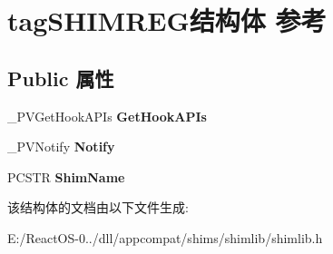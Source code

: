 \hypertarget{structtag_s_h_i_m_r_e_g}{}\section{tag\+S\+H\+I\+M\+R\+E\+G结构体 参考}
\label{structtag_s_h_i_m_r_e_g}
\subsection*{Public 属性}
\begin{DoxyCompactItemize}
\item 
\mbox{\label{structtag_s_h_i_m_r_e_g_aa53c592e6fc3a531d4a0d12100a64b00}} 
\+\_\+\+P\+V\+Get\+Hook\+A\+P\+Is {\bfseries Get\+Hook\+A\+P\+Is}
\item 
\mbox{\label{structtag_s_h_i_m_r_e_g_aa3132de5954b095010b2dfa8b99e42a6}} 
\+\_\+\+P\+V\+Notify {\bfseries Notify}
\item 
\mbox{\label{structtag_s_h_i_m_r_e_g_a7fd210629911cbda63d0dea479bf466c}} 
P\+C\+S\+TR {\bfseries Shim\+Name}
\end{DoxyCompactItemize}


该结构体的文档由以下文件生成\+:\begin{DoxyCompactItemize}
\item 
E\+:/\+React\+O\+S-\/0../dll/appcompat/shims/shimlib/shimlib.\+h\end{DoxyCompactItemize}
